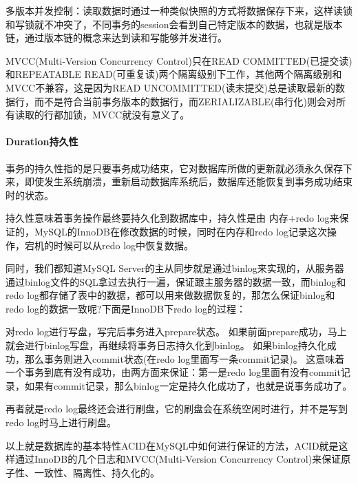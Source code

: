 \documentclass[../../../interview-questions.tex]{subfiles}
\begin{document}
多版本并发控制：读取数据时通过一种类似快照的方式将数据保存下来，这样读锁和写锁就不冲突了，不同事务的session会看到自己特定版本的数据，也就是版本链，通过版本链的概念来达到读和写能够并发进行。

MVCC(Multi-Version Concurrency Control)只在READ COMMITTED(已提交读)和REPEATABLE READ(可重复读)两个隔离级别下工作，其他两个隔离级别和MVCC不兼容，这是因为READ UNCOMMITTED(读未提交)总是读取最新的数据行，而不是符合当前事务版本的数据行，而ZERIALIZABLE(串行化)则会对所有读取的行都加锁，MVCC就没有意义了。

\paragraph{Duration持久性}

事务的持久性指的是只要事务成功结束，它对数据库所做的更新就必须永久保存下来，即使发生系统崩溃，重新启动数据库系统后，数据库还能恢复到事务成功结束时的状态。

持久性意味着事务操作最终要持久化到数据库中，持久性是由 内存+redo log来保证的，MySQL的InnoDB在修改数据的时候，同时在内存和redo log记录这次操作，宕机的时候可以从redo log中恢复数据。

同时，我们都知道MySQL Server的主从同步就是通过binlog来实现的，从服务器通过binlog文件的SQL拿过去执行一遍，保证跟主服务器的数据一致，而binlog和redo log都存储了表中的数据，都可以用来做数据恢复的，那怎么保证binlog和redo log的数据一致呢?下面是InnoDB下redo log的过程：

对redo log进行写盘，写完后事务进入prepare状态。
如果前面prepare成功，马上就会进行binlog写盘，再继续将事务日志持久化到binlog。
如果binlog持久化成功，那么事务则进入commit状态(在redo log里面写一条commit记录)。
这意味着一个事务到底有没有成功，由两方面来保证：第一是redo log里面有没有commit记录，如果有commit记录，那么binlog一定是持久化成功了，也就是说事务成功了。

再者就是redo log最终还会进行刷盘，它的刷盘会在系统空闲时进行，并不是写到redo log时马上进行刷盘。

以上就是数据库的基本特性ACID在MySQL中如何进行保证的方法，ACID就是这样通过InnoDB的几个日志和MVCC(Multi-Version Concurrency Control)来保证原子性、一致性、隔离性、持久化的。
\end{document}
